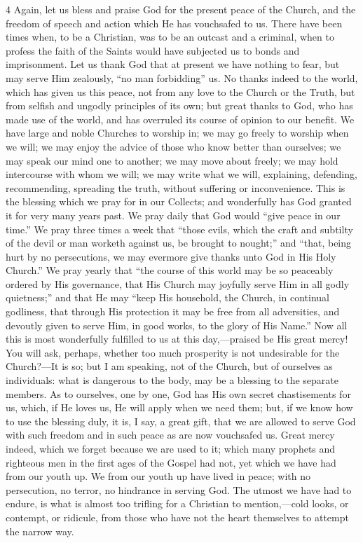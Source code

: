 4 Again, let us bless and praise God for the present peace of the
Church, and the freedom of speech and action which He has vouchsafed
to us. There have been times when, to be a Christian, was to be an
outcast and a criminal, when to profess the faith of the Saints would
have subjected us to bonds and imprisonment. Let us thank God that at
present we have nothing to fear, but may serve Him zealously, ``no
man forbidding'' us. No thanks indeed to the world, which has
given us this peace, not from any love to the Church or the Truth, but
from selfish and ungodly principles of its own; but great thanks to
God, who has made use of the world, and has overruled its course of
opinion to our benefit. We have large and noble Churches to worship
in; we may go freely to worship when we will; we may enjoy the advice
of those who know better than ourselves; we may speak our mind one to
another; we may move about freely; we may hold intercourse with whom
we will; we may write what we will, explaining, defending,
recommending, spreading the truth, without suffering or inconvenience.
This is the blessing which we pray for in our Collects; and
wonderfully has God granted it for very many years past. We pray daily
that God would ``give peace in our time.'' We pray three times
a week that ``those evils, which the craft and subtilty of the
devil or man worketh against us, be brought to nought;'' and
``that, being hurt by no persecutions, we may evermore give thanks
unto God in His Holy Church.'' We pray yearly that ``the
course of this world may be so peaceably ordered by His governance,
that His Church may joyfully serve Him in all godly quietness;''
and that He may ``keep His household, the Church, in continual
godliness, that through His protection it may be free from all
adversities, and devoutly given to serve Him, in good works, to the
glory of His Name.'' Now all this is most wonderfully fulfilled to
us at this day,—praised be His great mercy! You will ask, perhaps,
whether too much prosperity is not undesirable for the Church?—It is
so; but I am speaking, not of the Church, but of ourselves as
individuals: what is dangerous to the body, may be a blessing to the
separate members. As to ourselves, one by one, God has His own secret
chastisements for us, which, if He loves us, He will apply when we
need them; but, if we know how to use the blessing duly, it is, I say,
a great gift, that we are allowed to serve God with such freedom and
in such peace as are now vouchsafed us. Great mercy indeed, which we
forget because we are used to it; which many prophets and righteous
men in the first ages of the Gospel had not, yet which we have had
from our youth up. We from our youth up have lived in peace; with no
persecution, no terror, no hindrance in serving God. The utmost we have
had to endure, is what is almost too trifling for a Christian to
mention,—cold looks, or contempt, or ridicule, from those who have
not the heart themselves to attempt the narrow way.

